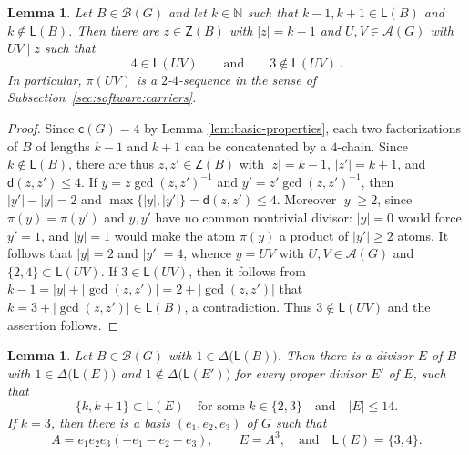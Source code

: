\documentclass[a4paper, 10pt]{amsart}
\theoremstyle{plain}
\newtheorem{lemma}[theorem]{\bf Lemma}
\theoremstyle{definition}
\theoremstyle{definition}
\newcommand{\N}{\mathbb N}
\numberwithin{equation}{section}
\begin{document}
\begin{lemma} \label{lem:first-jump-carrier}
Let $B \in \mathcal B (G)$ and let $k \in \N$ such that $k-1,k+1\in\mathsf L(B)$ and
$k\notin\mathsf L(B)$.  Then there are $z \in \mathsf Z (B)$ with $|z| = k-1$
and $U, V \in \mathcal A (G)$ with $UV \mid z$ such that
\[
 4 \in \mathsf L (UV)
 \qquad \text{and} \qquad
 3 \notin \mathsf L (UV) \,.
\]
In particular, $\pi (UV)$ is a $2$-$4$-sequence in the sense of
Subsection~\ref{sec:software:carriers}.
\end{lemma}

\begin{proof}
Since $\mathsf c (G) = 4$  by Lemma \ref{lem:basic-properties}, each two factorizations of $B$ of lengths $k-1$ and
$k+1$ can be concatenated by a $4$-chain. Since $k \notin \mathsf L (B)$, there are thus $z, z' \in \mathsf Z (B)$ with
$|z| = k-1$,  $|z'| = k+1$, and $\mathsf d (z,z') \le 4$.  If $y = z\gcd (z,z')^{-1}$ and
$y' = z'\gcd (z,z')^{-1}$, then $|y'|-|y| = 2$ and
$\max \{|y|,|y'|\} = \mathsf d (z,z') \le 4$.  Moreover $|y| \ge 2$, since
$\pi(y) = \pi(y')$ and $y, y'$ have no common nontrivial divisor: $|y|=0$ would force
$y'=1$, and $|y|=1$ would make the atom $\pi(y)$ a product of $|y'| \ge 2$
atoms.  It follows that $|y|=2$ and $|y'|=4$, whence $y = UV$ with $U, V \in \mathcal A (G)$ and
$\{2,4\} \subset \mathsf L (UV)$.  If $3 \in \mathsf L (UV)$, then it follows from $k-1=|y|+|\gcd (z,z')|=2+|\gcd (z,z')|$ that $k=3+|\gcd (z,z')|\in \mathsf L(B)$, a contradiction. Thus $3\not\in \mathsf L (UV)$ and the assertion follows.
\end{proof}


\begin{lemma} \label{lem:bounded-mixed-divisor}
Let $B \in \mathcal B (G)$ with $1 \in \Delta \big(\mathsf L (B) \big)$.  Then there is
a divisor $E$ of $B$ with $1 \in \Delta \big(\mathsf L (E) \big)$ and 
$1 \notin \Delta \big(\mathsf L (E') \big)$ for every proper divisor $E'$ of $E$, 
such that
\begin{equation}
\{k,k+1\}\subset\mathsf L(E) \quad \text{for some }k\in\{2,3\}
 \quad \text{and} \quad  |E| \le14.                                   \label{eq:mixed-core-bound}
\end{equation}
If $k=3$, then there is a basis $(e_1,e_2,e_3)$ of $G$ such that
\[
A=e_1e_2e_3(-e_1-e_2-e_3) , \qquad E=A^3, \quad \text{and} \quad \mathsf L(E)=\{3,4\}.
\]
\end{lemma}
\end{document}

